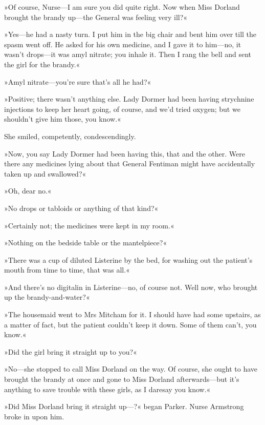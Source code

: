 »Of course, Nurse\allowbreak---\allowbreak I am sure you did quite right. Now when Miss Dorland brought the brandy up\allowbreak---\allowbreak the General was feeling very ill?«

»Yes\allowbreak---\allowbreak he had a nasty turn. I put him in the big chair and bent him over till the spasm went off. He asked for his own medicine, and I gave it to him\allowbreak---\allowbreak no, it wasn't drops\allowbreak---\allowbreak it was amyl nitrate; you inhale it. Then I rang the bell and sent the girl for the brandy.«

»Amyl nitrate\allowbreak---\allowbreak you're sure that's all he had?«

»Positive; there wasn't anything else. Lady Dormer had been having strychnine injections to keep her heart going, of course, and we'd tried oxygen; but we shouldn't give him those, you know.«

She smiled, competently, condescendingly.

»Now, you say Lady Dormer had been having this, that and the other. Were there any medicines lying about that General Fentiman might have accidentally taken up and swallowed?«

»Oh, dear no.«

»No drops or tabloids or anything of that kind?«

»Certainly not; the medicines were kept in my room.«

»Nothing on the bedside table or the mantelpiece?«

»There was a cup of diluted Listerine by the bed, for washing out the patient's mouth from time to time, that was all.«

»And there's no digitalin in Listerine\allowbreak---\allowbreak no, of course not. Well now, who brought up the brandy-and-water?«

»The housemaid went to Mrs Mitcham for it. I should have had some upstairs, as a matter of fact, but the patient couldn't keep it down. Some of them can't, you know.«

»Did the girl bring it straight up to you?«

»No\allowbreak---\allowbreak she stopped to call Miss Dorland on the way. Of course, she ought to have brought the brandy at once and gone to Miss Dorland afterwards\allowbreak---\allowbreak but it's anything to save trouble with these girls, as I daresay you know.«

»Did Miss Dorland bring it straight up---?« began Parker. Nurse Armstrong broke in upon him.

